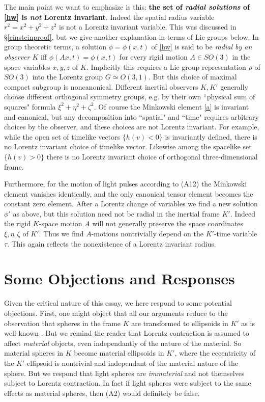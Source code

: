 \documentclass[12pt]{article}
\begin{document}
The main point we want to emphasize is this: \textbf{the set of \emph{radial solutions} of \eqref{hw} is \emph{not} Lorentz invariant}. Indeed the spatial radius variable $r^2=x^2+y^2+z^2$ is not a Lorentz invariant variable. This was discussed in \S\ref{einsteinproof}, but we give another explanation in terms of Lie groups below. In group theoretic terms, a solution $\phi=\phi(x,t)$ of \eqref{hw} is said to be \emph{radial by an observer $K$} iff $\phi(Ax,t)=\phi(x,t)$ for every rigid motion $A\in SO(3)$ in the space variables $x,y,z$ of $K$. Implicitly this requires a Lie group representation $\rho$ of $SO(3)$ into the Lorentz group $G\simeq O(3,1)$. But this choice of maximal compact subgroup is noncanonical. Different inertial observers $K, K'$ generally choose different orthogonal symmetry groups, e.g. by their own ``physical sum of squares" formula $\xi^2+\eta^2+\zeta^2$. Of course the Minkowski element \eqref{a} is invariant and canonical, but any decomposition into ``spatial" and ``time" requires arbitrary choices by the observer, and these choices are not Lorentz invariant. For example, while the open set of timelike vectors $\{h(v)<0\}$ is invariantly defined, there is no Lorentz invariant choice of timelike vector. Likewise among the spacelike set $\{h(v)>0\}$ there is no Lorentz invariant choice of orthogonal three-dimensional frame. 

Furthermore, for the motion of light pulses according to (A12) the Minkowski element vanishes identically, and the only canonical tensor element becomes the constant zero element. After a Lorentz change of variables we find a new solution $\phi'$ as above, but this solution need not be radial in the inertial frame $K'$. Indeed the rigid $K$-space motion $A$ will not generally preserve the space coordinates $\xi, \eta, \zeta$ of $K'$. Thus we find $A$-motions nontrivially depend on the $K'$-time variable $\tau$. This again reflects the nonexistence of a Lorentz invariant radius.








\section{Some Objections and Responses}\label{objections}
Given the critical nature of this essay, we here respond to some potential objections. First, one might object that all our arguments reduce to the observation that spheres in the frame $K$ are transformed to ellipsoids in $K'$ as is well-known \cite[\S 4]{einstein1905electrodynamics}. But we remind the reader that Lorentz contraction is assumed to affect \emph{material} objects, even independantly of the nature of the material. So material spheres in $K$ become material ellipsoids in $K'$, where the eccentricity of the $K'$-ellipsoid is nontrivial and independant of the material nature of the sphere. But we respond that light spheres are \emph{immaterial} and not themselves subject to Lorentz contraction. In fact if light spheres were subject to the same effects as material spheres, then (A2) would definitely be false.
\end{document}

